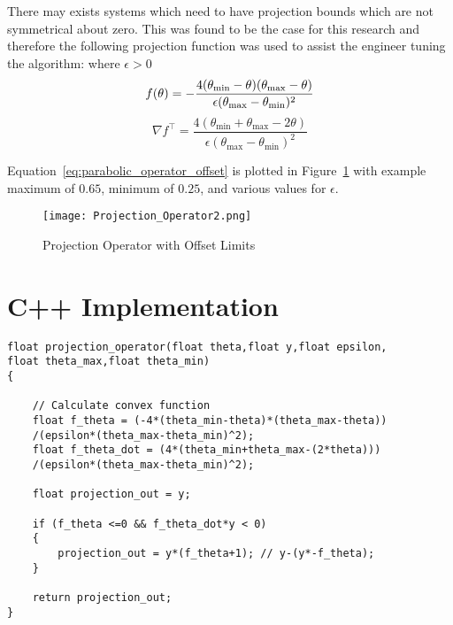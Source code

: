 There may exists systems which need to have projection bounds which are not symmetrical about zero.  This was found to be the case for this research and therefore the following projection function was used to assist the engineer tuning the algorithm:\newline
\newline
where $\epsilon>0$
\begin{equation}\label{eq:parabolic_operator_offset}
	f(\theta)=-\frac{4(\theta_{\text{min}}-\theta)(\theta_{\text{max}}-\theta)}{\epsilon(\theta_{\text{max}}-\theta_{\text{min}})^2}\\
\end{equation}
\begin{equation}
	\nabla f^\top=\frac{4(\theta_{\text{min}}+\theta_{\text{max}}-2\theta)}{\epsilon(\theta_{\text{max}}-\theta_{\text{min}})^2}
\end{equation}


Equation~\ref{eq:parabolic_operator_offset} is plotted in Figure~\ref{fig:projection_operator_offset} with example maximum of $0.65$, minimum of $0.25$,  and various values for $\epsilon$. 
\begin{figure}[h!]
 \centering
  \texttt{[image: Projection\_Operator2.png]}
  \caption{Projection Operator with Offset Limits}
  \label{fig:projection_operator_offset}
\end{figure}

\section{C++ Implementation}


\begin{lstlisting}
float projection_operator(float theta,float y,float epsilon,
float theta_max,float theta_min)
{
	
	// Calculate convex function
	float f_theta = (-4*(theta_min-theta)*(theta_max-theta))
	/(epsilon*(theta_max-theta_min)^2);
	float f_theta_dot = (4*(theta_min+theta_max-(2*theta)))
	/(epsilon*(theta_max-theta_min)^2);	

	float projection_out = y;

	if (f_theta <=0 && f_theta_dot*y < 0)
	{
		projection_out = y*(f_theta+1); // y-(y*-f_theta);
	}	
 
   	return projection_out;
}
\end{lstlisting}